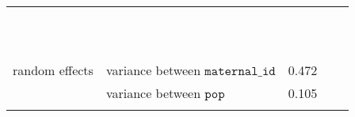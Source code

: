 \begin{table}
\begin{tabular}[t]{>{\raggedright\arraybackslash}p{3cm}>{\raggedright\arraybackslash}p{5cm}rrr}
\cellcolor{gray!6}{} & \cellcolor{gray!6}{$\beta_{\mathtt{age}^4\times\mathtt{parity}}$} & \cellcolor{gray!6}{-3263} & \cellcolor{gray!6}{6416} & \cellcolor{gray!6}{-0.509}\\
\cellcolor{gray!6}{} & \cellcolor{gray!6}{$\beta_{\mathtt{parity}^2}$} & \cellcolor{gray!6}{-19.8} & \cellcolor{gray!6}{105} & \cellcolor{gray!6}{-0.188}\\
\cellcolor{gray!6}{} & \cellcolor{gray!6}{$\beta_{\mathtt{age}\times\mathtt{parity}^2}$} & \cellcolor{gray!6}{24157} & \cellcolor{gray!6}{38317} & \cellcolor{gray!6}{0.63}\\
\cellcolor{gray!6}{} & \cellcolor{gray!6}{$\beta_{\mathtt{age}^2\times\mathtt{parity}^2}$} & \cellcolor{gray!6}{-6236} & \cellcolor{gray!6}{22842} & \cellcolor{gray!6}{-0.273}\\
\cellcolor{gray!6}{} & \cellcolor{gray!6}{$\beta_{\mathtt{age}^3\times\mathtt{parity}^2}$} & \cellcolor{gray!6}{10729} & \cellcolor{gray!6}{8894} & \cellcolor{gray!6}{1.21}\\
\cellcolor{gray!6}{} & \cellcolor{gray!6}{$\beta_{\mathtt{parity}^3}$} & \cellcolor{gray!6}{25.9} & \cellcolor{gray!6}{64.7} & \cellcolor{gray!6}{0.4}\\
\cellcolor{gray!6}{} & \cellcolor{gray!6}{$\beta_{\mathtt{age}\times\mathtt{parity}^3}$} & \cellcolor{gray!6}{-15049} & \cellcolor{gray!6}{19092} & \cellcolor{gray!6}{-0.788}\\
\cellcolor{gray!6}{} & \cellcolor{gray!6}{$\beta_{\mathtt{age}^2\times\mathtt{parity}^3}$} & \cellcolor{gray!6}{1073} & \cellcolor{gray!6}{8613} & \cellcolor{gray!6}{0.125}\\
\cellcolor{gray!6}{} & \cellcolor{gray!6}{$\beta_{\mathtt{parity}^4}$} & \cellcolor{gray!6}{24} & \cellcolor{gray!6}{21.4} & \cellcolor{gray!6}{1.12}\\
\cellcolor{gray!6}{} & \cellcolor{gray!6}{$\beta_{\mathtt{age}\times\mathtt{parity}^4}$} & \cellcolor{gray!6}{-1749} & \cellcolor{gray!6}{5030} & \cellcolor{gray!6}{-0.348}\\
\cellcolor{gray!6}{} & \cellcolor{gray!6}{$\beta_{\mathtt{parity}^5}$} & \cellcolor{gray!6}{-4.66} & \cellcolor{gray!6}{4.84} & \cellcolor{gray!6}{-0.962}\\
random effects & variance between $\mathtt{maternal\_id}$ & 0.472 &  & \\
 & variance between $\mathtt{pop}$ & 0.105 &  & \\
\cellcolor{gray!6}{response family} & \cellcolor{gray!6}{binomial with logit link} & \cellcolor{gray!6}{} & \cellcolor{gray!6}{} & \cellcolor{gray!6}{}\\

\end{tabular}
\end{table}

